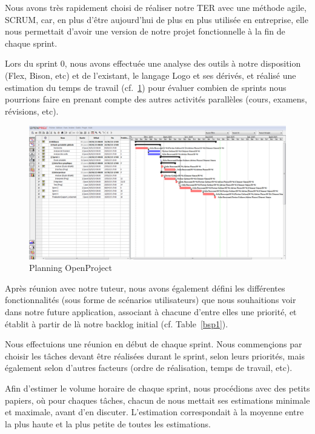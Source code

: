 Nous avons très rapidement choisi de réaliser notre TER avec une méthode agile, SCRUM, car, en plus d'être aujourd'hui de plus en plus utilisée en entreprise, elle nous permettait d'avoir une version de notre projet fonctionnelle à la fin de chaque sprint.

Lors du sprint 0, nous avons effectuée une analyse des outils à notre disposition (Flex, Bison, etc) et de l'existant, le langage Logo et ses dérivés, et réalisé une estimation du temps de travail (cf.~\ref{planning}) pour évaluer combien de sprints nous pourrions faire en prenant compte des autres activités parallèles (cours, examens, révisions, etc).
\begin{figure}[h]
\caption{\label{planning} Planning OpenProject}
\includegraphics[scale=0.35]{doc/gestionProjet/planning.PNG}
\end{figure}

Après réunion avec notre tuteur, nous avons également défini les différentes fonctionnalités (sous forme de scénarios utilisateurs) que nous souhaitions voir dans notre future application, associant à chacune d'entre elles une priorité, et établit à partir de là notre backlog initial (cf. Table~\ref{bsp1}).


Nous effectuions une réunion en début de chaque sprint. Nous commençions par choisir les tâches devant être réalisées durant le sprint, selon leurs priorités, mais également selon d'autres facteurs (ordre de réalisation, temps de travail, etc). 

Afin d'estimer le volume horaire de chaque sprint, nous procédions avec des petits papiers, où pour chaques tâches, chacun de nous mettait ses estimations minimale et maximale, avant d'en discuter. L'estimation correspondait à la moyenne entre la plus haute et la plus petite de toutes les estimations. 

